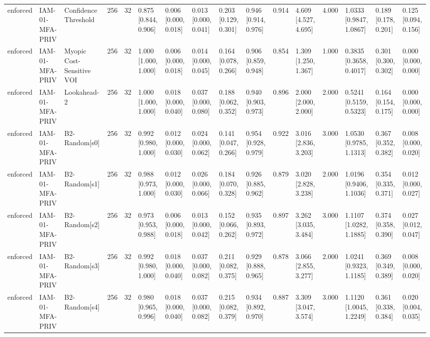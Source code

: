 \begin{table}[!ht]
{\begin{tabular}{llllllllllllllll}
enforced & IAM-01-MFA-PRIV & Confidence Threshold & 256 & 32 & 0.875 [0.844, 0.906] & 0.006 [0.000, 0.018] & 0.013 [0.000, 0.041] & 0.203 [0.129, 0.301] & 0.946 [0.914, 0.976] & 0.914 & 4.609 [4.527, 4.695] & 4.000 & 1.0333 [0.9847, 1.0867] & 0.189 [0.178, 0.201] & 0.125 [0.094, 0.156] \\
enforced & IAM-01-MFA-PRIV & Myopic Cost-Sensitive VOI & 256 & 32 & 1.000 [1.000, 1.000] & 0.006 [0.000, 0.018] & 0.014 [0.000, 0.045] & 0.164 [0.078, 0.266] & 0.906 [0.859, 0.948] & 0.854 & 1.309 [1.250, 1.367] & 1.000 & 0.3835 [0.3658, 0.4017] & 0.301 [0.300, 0.302] & 0.000 [0.000, 0.000] \\
enforced & IAM-01-MFA-PRIV & Lookahead-2 & 256 & 32 & 1.000 [1.000, 1.000] & 0.018 [0.000, 0.040] & 0.037 [0.000, 0.080] & 0.188 [0.062, 0.352] & 0.940 [0.903, 0.973] & 0.896 & 2.000 [2.000, 2.000] & 2.000 & 0.5241 [0.5159, 0.5323] & 0.164 [0.154, 0.175] & 0.000 [0.000, 0.000] \\
enforced & IAM-01-MFA-PRIV & B2-Random[s0] & 256 & 32 & 0.992 [0.980, 1.000] & 0.012 [0.000, 0.030] & 0.024 [0.000, 0.062] & 0.141 [0.047, 0.266] & 0.954 [0.928, 0.979] & 0.922 & 3.016 [2.836, 3.203] & 3.000 & 1.0530 [0.9785, 1.1313] & 0.367 [0.352, 0.382] & 0.008 [0.000, 0.020] \\
enforced & IAM-01-MFA-PRIV & B2-Random[s1] & 256 & 32 & 0.988 [0.973, 1.000] & 0.012 [0.000, 0.030] & 0.026 [0.000, 0.066] & 0.184 [0.070, 0.328] & 0.926 [0.885, 0.962] & 0.879 & 3.020 [2.828, 3.238] & 2.000 & 1.0196 [0.9406, 1.1036] & 0.354 [0.335, 0.371] & 0.012 [0.000, 0.027] \\
enforced & IAM-01-MFA-PRIV & B2-Random[s2] & 256 & 32 & 0.973 [0.953, 0.988] & 0.006 [0.000, 0.018] & 0.013 [0.000, 0.042] & 0.152 [0.066, 0.262] & 0.935 [0.893, 0.972] & 0.897 & 3.262 [3.035, 3.484] & 3.000 & 1.1107 [1.0282, 1.1885] & 0.374 [0.358, 0.390] & 0.027 [0.012, 0.047] \\
enforced & IAM-01-MFA-PRIV & B2-Random[s3] & 256 & 32 & 0.992 [0.980, 1.000] & 0.018 [0.000, 0.040] & 0.037 [0.000, 0.082] & 0.211 [0.082, 0.375] & 0.929 [0.888, 0.965] & 0.878 & 3.066 [2.855, 3.277] & 2.000 & 1.0241 [0.9323, 1.1185] & 0.369 [0.349, 0.389] & 0.008 [0.000, 0.020] \\
enforced & IAM-01-MFA-PRIV & B2-Random[s4] & 256 & 32 & 0.980 [0.965, 0.996] & 0.018 [0.000, 0.040] & 0.037 [0.000, 0.082] & 0.215 [0.082, 0.379] & 0.934 [0.892, 0.970] & 0.887 & 3.309 [3.047, 3.574] & 3.000 & 1.1120 [1.0045, 1.2249] & 0.361 [0.338, 0.384] & 0.020 [0.004, 0.035] \\

\end{tabular}}
\end{table}
